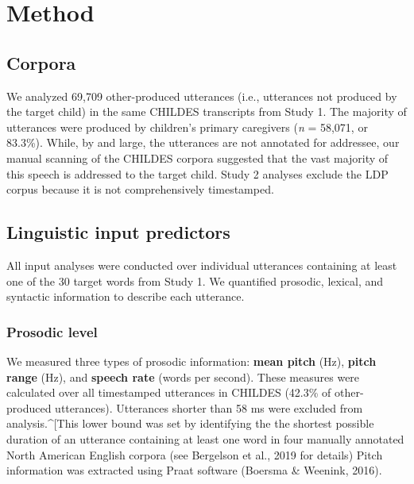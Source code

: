 \documentclass[10pt, letterpaper]{article}
\begin{document}
\hypertarget{method-1}{%
\section{Method}\label{method-1}}

\hypertarget{corpora-1}{%
\subsection{Corpora}\label{corpora-1}}

We analyzed 69,709 other-produced utterances (i.e., utterances not
produced by the target child) in the same CHILDES transcripts from Study
1. The majority of utterances were produced by children's primary
caregivers (\emph{n} = 58,071, or 83.3\%). While, by and large, the
utterances are not annotated for addressee, our manual scanning of the
CHILDES corpora suggested that the vast majority of this speech is
addressed to the target child. Study 2 analyses exclude the LDP corpus
because it is not comprehensively timestamped.

\hypertarget{linguistic-input-predictors}{%
\subsection{Linguistic input
predictors}\label{linguistic-input-predictors}}

All input analyses were conducted over individual utterances containing
at least one of the 30 target words from Study 1. We quantified
prosodic, lexical, and syntactic information to describe each utterance.

\hypertarget{prosodic-level}{%
\subsubsection{Prosodic level}\label{prosodic-level}}

We measured three types of prosodic information: \textbf{mean pitch}
(Hz), \textbf{pitch range} (Hz), and \textbf{speech rate} (words per
second). These measures were calculated over all timestamped utterances
in CHILDES (42.3\% of other-produced utterances). Utterances shorter
than 58 ms were excluded from analysis.\^{}{[}This lower bound was set
by identifying the the shortest possible duration of an utterance
containing at least one word in four manually annotated North American
English corpora (see Bergelson et al., 2019 for details) Pitch
information was extracted using Praat software (Boersma \& Weenink,
2016).
\end{document}
